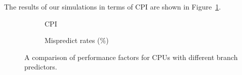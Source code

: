 The results of our simulations in terms of CPI are shown in Figure~\ref{fig:partd-cpi}.

%
%
%
%
%

\begin{figure}[b]%
\begin{subfigure}{.5\textwidth}
    \centering
    
    \caption{CPI}
    \label{fig:partd-cpi}
\end{subfigure}%
\begin{subfigure}{.5\textwidth}
    \centering
    
    \caption{Mispredict rates (\%)}
    \label{fig:partd-mispredict}
\end{subfigure}%
\caption{A comparison of performance factors for CPUs with different branch predictors.}
\label{fig:partd-factors}
\end{figure}

